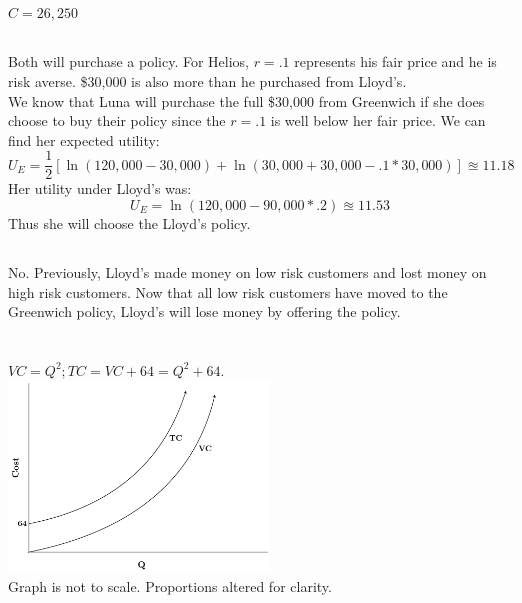 \documentclass{article}
\begin{document}
	\subsection[j]{}
		$ C = 26,250 $
	\subsection[k]{}
		Both will purchase a policy. For Helios, $r=.1$ represents his fair price and he is risk averse. \$30,000 is also more than he purchased from Lloyd's. \\
		We know that Luna will purchase the full \$30,000 from Greenwich if she does choose to buy their policy since the $ r=.1$ is well below her fair price. We can find her expected utility: 
		$$
			U_E = \frac{1}{2}[\ln (120,000 - 30,000) + \ln (30,000 + 30,000 - .1*30,000)] \approxeq 11.18
		$$
		Her utility under Lloyd's was: 
		$$
			U_E = \ln(120,000 - 90,000 * .2) \approxeq 11.53
		$$
		Thus she will choose the Lloyd's policy. 
	\subsection[l]{}
		No. Previously, Lloyd's made money on low risk customers and lost money on high risk customers. Now that all low risk customers have moved to the Greenwich policy, Lloyd's will lose money by offering the policy. 
		

\section[6]{}
	\subsection[a]{}
		$ VC = Q^2; TC = VC + 64 = Q^2+64. $ \\
		\includegraphics[height=2in]{Charts/6a}
		 \\Graph is not to scale. Proportions altered for clarity. 	
\end{document}
